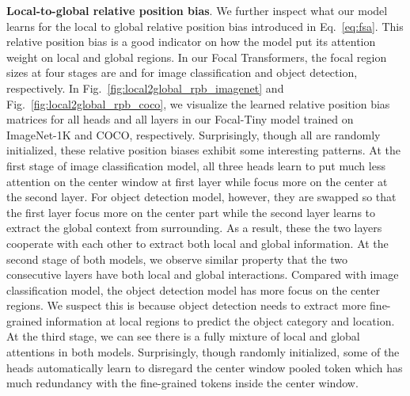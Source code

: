 \documentclass{article}
\begin{document}
\textbf{Local-to-global relative position bias}. We further inspect what our model learns for the local to global relative position bias introduced in Eq.~\eqref{eq:fsa}. This relative position bias is a good indicator on how the model put its attention weight on local and global regions. In our Focal Transformers, the focal region sizes at four stages are  and  for image classification and object detection, respectively. In Fig.~\ref{fig:local2global_rpb_imagenet} and Fig.~\ref{fig:local2global_rpb_coco}, we visualize the learned relative position bias matrices for all heads and all layers in our Focal-Tiny model trained on ImageNet-1K and COCO, respectively. Surprisingly, though all are randomly initialized, these relative position biases exhibit some interesting patterns. At the first stage of image classification model, all three heads learn to put much less attention on the center window at first layer while focus more on the center at the second layer. For object detection model, however, they are swapped so that the first layer focus more on the center part while the second layer learns to extract the global context from surrounding. As a result, these the two layers cooperate with each other to extract both local and global information. At the second stage of both models, we observe similar property that the two consecutive layers have both local and global interactions. Compared with image classification model, the object detection model has more focus on the center regions. We suspect this is because object detection needs to extract more fine-grained information at local regions to predict the object category and location. At the third stage, we can see there is a fully mixture of local and global attentions in both models. Surprisingly, though randomly initialized, some of the heads automatically learn to disregard the center window pooled token which has much redundancy with the fine-grained tokens inside the center window. 















%
 
\end{document}
